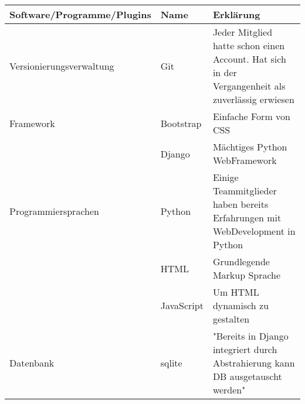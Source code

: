 \begin{table}
\centering
\tiny
\begin{tabularx}{\textwidth}{|l|l|X|} 
 \hline 
Software/Programme/Plugins & Name & Erklärung \\ 
\hline
Versionierungsverwaltung & Git & Jeder Mitglied hatte schon einen Account. Hat sich in der Vergangenheit als zuverlässig erwiesen \\ 
\hline
Framework & Bootstrap & Einfache Form von CSS \\ 
\hline
 & Django & Mächtiges Python WebFramework \\ 
\hline
Programmiersprachen & Python & Einige Teammitglieder haben bereits Erfahrungen mit WebDevelopment in Python \\ 
\hline
 & HTML & Grundlegende Markup Sprache  \\ 
\hline
 & JavaScript & Um HTML dynamisch zu gestalten \\ 
\hline
Datenbank & sqlite & "Bereits in Django integriert durch Abstrahierung kann DB ausgetauscht werden" \\ 
\hline
\end{tabularx}
\end{table}